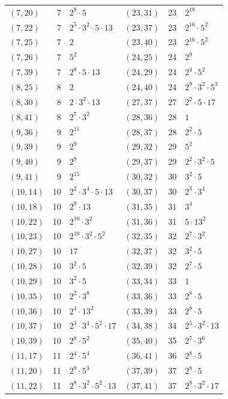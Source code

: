 \documentclass[11pt]{article}
\begin{document}
\begin{longtable}{@{}lrl@{\qquad}lrl@{}}
$(7,20)$ & 7 & $2^{8}\cdot 5$ & $(23,31)$ & 23 & $2^{18}$\\
$(7,22)$ & 7 & $2^{5}\cdot 3^{2}\cdot 5\cdot 13$ & $(23,37)$ & 23 & $2^{16}\cdot 5^{2}$\\
$(7,25)$ & 7 & $2$ & $(23,40)$ & 23 & $2^{16}\cdot 5^{2}$\\
$(7,26)$ & 7 & $5^{2}$ & $(24,25)$ & 24 & $2^{9}$\\
$(7,39)$ & 7 & $2^{8}\cdot 5\cdot 13$ & $(24,29)$ & 24 & $2^{4}\cdot 5^{2}$\\
$(8,25)$ & 8 & $2$ & $(24,40)$ & 24 & $2^{9}\cdot 3^{2}\cdot 5^{3}$\\
$(8,30)$ & 8 & $2\cdot 3^{2}\cdot 13$ & $(27,37)$ & 27 & $2^{2}\cdot 5\cdot 17$\\
$(8,41)$ & 8 & $2^{7}\cdot 3^{2}$ & $(28,36)$ & 28 & $1$\\
$(9,36)$ & 9 & $2^{11}$ & $(28,37)$ & 28 & $2^{2}\cdot 5$\\
$(9,39)$ & 9 & $2^{9}$ & $(29,32)$ & 29 & $5^{2}$\\
$(9,40)$ & 9 & $2^{9}$ & $(29,37)$ & 29 & $2^{2}\cdot 3^{2}\cdot 5$\\
$(9,41)$ & 9 & $2^{15}$ & $(30,32)$ & 30 & $3^{2}\cdot 5$\\
$(10,14)$ & 10 & $2^{2}\cdot 3^{4}\cdot 5\cdot 13$ & $(30,37)$ & 30 & $2^{3}\cdot 3^{4}$\\
$(10,18)$ & 10 & $2^{9}\cdot 13$ & $(31,35)$ & 31 & $3^{4}$\\
$(10,22)$ & 10 & $2^{10}\cdot 3^{2}$ & $(31,36)$ & 31 & $5\cdot 13^{2}$\\
$(10,23)$ & 10 & $2^{10}\cdot 3^{2}\cdot 5^{2}$ & $(32,35)$ & 32 & $2^{7}\cdot 3^{2}$\\
$(10,27)$ & 10 & $17$ & $(32,37)$ & 32 & $3^{2}\cdot 5$\\
$(10,28)$ & 10 & $3^{2}\cdot 5$ & $(32,39)$ & 32 & $2^{7}\cdot 5$\\
$(10,29)$ & 10 & $3^{2}\cdot 5$ & $(33,34)$ & 33 & $1$\\
$(10,35)$ & 10 & $2^{2}\cdot 3^{8}$ & $(33,36)$ & 33 & $2^{8}\cdot 5$\\
$(10,36)$ & 10 & $2^{4}\cdot 13^{2}$ & $(33,39)$ & 33 & $2^{8}\cdot 5$\\
$(10,37)$ & 10 & $2^{3}\cdot 3^{4}\cdot 5^{2}\cdot 17$ & $(34,38)$ & 34 & $2^{5}\cdot 3^{2}\cdot 13$\\
$(10,39)$ & 10 & $2^{8}\cdot 5^{2}$ & $(35,40)$ & 35 & $2^{7}\cdot 3^{6}$\\
$(11,17)$ & 11 & $2^{4}\cdot 5^{4}$ & $(36,41)$ & 36 & $2^{8}\cdot 5$\\
$(11,20)$ & 11 & $2^{9}\cdot 5^{3}$ & $(37,39)$ & 37 & $2^{8}\cdot 5$\\
$(11,22)$ & 11 & $2^{8}\cdot 3^{2}\cdot 5^{2}\cdot 13$ & $(37,41)$ & 37 & $2^{8}\cdot 3^{2}\cdot 17$\\
\end{longtable}
\endgroup
\end{document}
